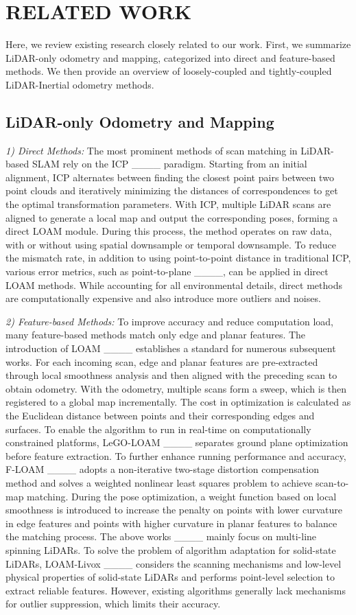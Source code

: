 \section{RELATED WORK}
Here, we review existing research closely related to our work. First, we summarize LiDAR-only odometry and mapping, categorized into direct and feature-based methods. We then provide an overview of loosely-coupled and tightly-coupled LiDAR-Inertial odometry methods.
\subsection{LiDAR-only Odometry and Mapping}
\emph{1) Direct Methods:}
The most prominent methods of scan matching in LiDAR-based SLAM rely on the ICP ____ paradigm. Starting from an initial alignment, ICP alternates between finding the closest point pairs between two point clouds and iteratively minimizing the distances of correspondences to get the optimal transformation parameters. With ICP, multiple LiDAR scans are aligned to generate a local map and output the corresponding poses, forming a direct LOAM module. During this process, the method operates on raw data, with or without using spatial downsample or temporal downsample. To reduce the mismatch rate, in addition to using point-to-point distance in traditional ICP, various error metrics, such as point-to-plane ____, can be applied in direct LOAM methods. While accounting for all environmental details, direct methods are computationally expensive and also introduce more outliers and noises.

\emph{2) Feature-based Methods:}
To improve accuracy and reduce computation load, many feature-based methods match only edge and planar features. The introduction of LOAM ____ establishes a standard for numerous subsequent works. For each incoming scan, edge and planar features are pre-extracted through local smoothness analysis and then aligned with the preceding scan to obtain odometry. With the odometry, multiple scans form a sweep, which is then registered to a global map incrementally. The cost in optimization is calculated as the Euclidean distance between points and their corresponding edges and surfaces.
To enable the algorithm to run in real-time on computationally constrained platforms, LeGO-LOAM ____ separates ground plane optimization before feature extraction. To further enhance running performance and accuracy, F-LOAM ____ adopts a non-iterative two-stage distortion compensation method and solves a weighted nonlinear least squares problem to achieve scan-to-map matching. During the pose optimization, a weight function based on local smoothness is introduced to increase the penalty on points with lower curvature in edge features and points with higher curvature in planar features to balance the matching process. 
The above works ____ mainly focus on multi-line spinning LiDARs. To solve the problem of algorithm adaptation for solid-state LiDARs, LOAM-Livox ____ considers the scanning mechanisms and low-level physical properties of solid-state LiDARs and performs point-level selection to extract reliable features. However, existing algorithms generally lack mechanisms for outlier suppression, which limits their accuracy. 
